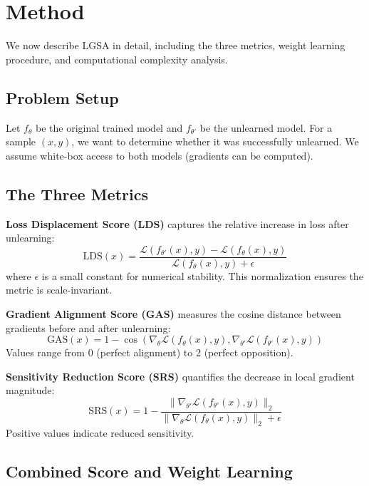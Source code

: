 \documentclass{article}
\begin{document}
\section{Method}
\label{sec:method}

We now describe LGSA in detail, including the three metrics, weight learning procedure, and computational complexity analysis.

\subsection{Problem Setup}

Let $f_\theta$ be the original trained model and $f_{\theta'}$ be the unlearned model. For a sample $(x, y)$, we want to determine whether it was successfully unlearned. We assume white-box access to both models (gradients can be computed).

\subsection{The Three Metrics}

\textbf{Loss Displacement Score (LDS)} captures the relative increase in loss after unlearning:
\begin{equation}
\text{LDS}(x) = \frac{\mathcal{L}(f_{\theta'}(x), y) - \mathcal{L}(f_\theta(x), y)}{\mathcal{L}(f_\theta(x), y) + \epsilon}
\end{equation}
where $\epsilon$ is a small constant for numerical stability. This normalization ensures the metric is scale-invariant.

\textbf{Gradient Alignment Score (GAS)} measures the cosine distance between gradients before and after unlearning:
\begin{equation}
\text{GAS}(x) = 1 - \cos\left(\nabla_\theta \mathcal{L}(f_\theta(x), y), \nabla_{\theta'} \mathcal{L}(f_{\theta'}(x), y)\right)
\end{equation}
Values range from 0 (perfect alignment) to 2 (perfect opposition).

\textbf{Sensitivity Reduction Score (SRS)} quantifies the decrease in local gradient magnitude:
\begin{equation}
\text{SRS}(x) = 1 - \frac{\|\nabla_{\theta'} \mathcal{L}(f_{\theta'}(x), y)\|_2}{\|\nabla_\theta \mathcal{L}(f_\theta(x), y)\|_2 + \epsilon}
\end{equation}
Positive values indicate reduced sensitivity.

\subsection{Combined Score and Weight Learning}
\end{document}
